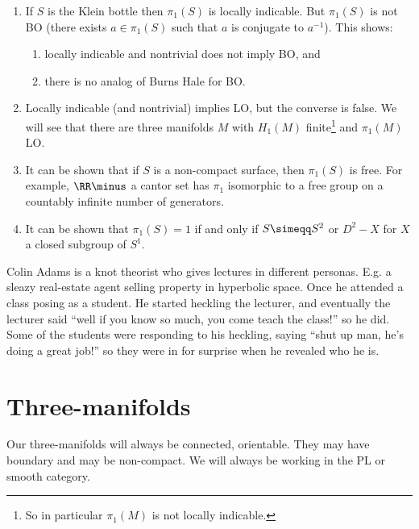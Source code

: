 \begin{rmk}
\begin{enumerate}
\item If $S$ is the Klein bottle then $\pi_1\left(S\right)$ is locally indicable. But
$\pi_1\left(S\right)$ is not BO (there exists $a\in \pi_1\left(S\right)$ such that $a$ is
conjugate to $a^{-1}$).
This shows:
\begin{enumerate}
\item locally indicable and nontrivial does not imply BO, and
\item there is no analog of Burns Hale for BO.
\end{enumerate}
\item Locally indicable (and nontrivial) implies LO, but the converse is false. We will
see that there are three manifolds $M$ with $H_1\left(M\right)$ finite\footnote{So in
particular $\pi_1\left(M\right)$ is not locally indicable.} and
$\pi_1\left(M\right)$ LO. 

\item It can be shown that if $S$ is a non-compact surface, then $\pi_1\left(S\right)$ is
free. For example, $\RR\minus $ a cantor set has $\pi_1$ isomorphic to a free group on
a countably infinite number of generators. 

\item It can be shown that $\pi_1\left(S\right) = 1$ if and only if $S\simeqq S^2$
or $D^2 \minus X$ for $X$ a closed subgroup of $S^1$.
\end{enumerate}
\end{rmk}

\begin{rmk}
Colin Adams is a 
knot theorist who gives lectures in different personas. E.g. a sleazy
real-estate agent selling property in hyperbolic space.
Once he attended a class posing as a student. He started heckling the lecturer, and
eventually the  lecturer said ``well if you know so much, you come teach the class!'' so
he did. Some of the students were responding to his heckling, saying ``shut up man, he's doing a
great job!'' so they were in for surprise when he revealed who he is.
\end{rmk}

\chapter{Three-manifolds}

Our three-manifolds will always be connected, orientable. They may have boundary and may
be non-compact. 
We will always be working in the PL or smooth category.

